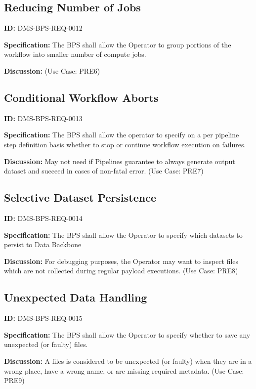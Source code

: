 \documentclass[SE,toc]{lsstdoc}
\begin{document}
\subsection{Reducing Number of Jobs}

\label{DMS-BPS-REQ-0012}
\textbf{ID:} DMS-BPS-REQ-0012

\textbf{Specification:}
The BPS shall allow the Operator to group portions of the workflow into smaller number of compute jobs.

\textbf{Discussion:}
(Use Case: PRE6)

\subsection{Conditional Workflow Aborts}

\label{DMS-BPS-REQ-0013}
\textbf{ID:} DMS-BPS-REQ-0013

\textbf{Specification:}
The BPS shall allow the operator to specify on a per pipeline step definition basis whether to stop or continue workflow execution on failures.

\textbf{Discussion:}
May not need if Pipelines guarantee to always generate output dataset and succeed in cases of non-fatal error.  (Use Case: PRE7)

\subsection{Selective Dataset Persistence}

\label{DMS-BPS-REQ-0014}
\textbf{ID:} DMS-BPS-REQ-0014

\textbf{Specification:}
The BPS shall allow the Operator to specify which datasets to persist to Data Backbone

\textbf{Discussion:}
For debugging purposes, the Operator may want to inspect files which are not collected during regular payload executions.  (Use Case: PRE8)

\subsection{Unexpected Data Handling}

\label{DMS-BPS-REQ-0015}
\textbf{ID:} DMS-BPS-REQ-0015

\textbf{Specification:}
The BPS shall allow the Operator to specify whether to save any unexpected (or faulty) files.

\textbf{Discussion:}
A files is considered to be unexpected (or faulty) when they are in a wrong place, have a wrong name, or are missing required metadata.  (Use Case: PRE9)
\end{document}

